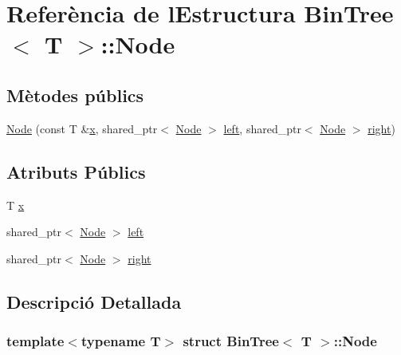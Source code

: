 \hypertarget{struct_bin_tree_1_1_node}{}\section{Referència de l\textquotesingle{}Estructura Bin\+Tree$<$ T $>$\+:\+:Node}
\label{struct_bin_tree_1_1_node}
\subsection*{Mètodes públics}
\begin{DoxyCompactItemize}
\item 
\hyperlink{struct_bin_tree_1_1_node_af45885e303875c018e89fa5c8b96bde0}{Node} (const T \&\hyperlink{struct_bin_tree_1_1_node_a9c268d4af01559e8237dbeb5bd19af91}{x}, shared\+\_\+ptr$<$ \hyperlink{struct_bin_tree_1_1_node}{Node} $>$ \hyperlink{struct_bin_tree_1_1_node_a265a6367635a38838e6a6366564be78d}{left}, shared\+\_\+ptr$<$ \hyperlink{struct_bin_tree_1_1_node}{Node} $>$ \hyperlink{struct_bin_tree_1_1_node_a6df770137090da60cd0376ce06893cbd}{right})
\end{DoxyCompactItemize}
\subsection*{Atributs Públics}
\begin{DoxyCompactItemize}
\item 
T \hyperlink{struct_bin_tree_1_1_node_a9c268d4af01559e8237dbeb5bd19af91}{x}
\item 
shared\+\_\+ptr$<$ \hyperlink{struct_bin_tree_1_1_node}{Node} $>$ \hyperlink{struct_bin_tree_1_1_node_a265a6367635a38838e6a6366564be78d}{left}
\item 
shared\+\_\+ptr$<$ \hyperlink{struct_bin_tree_1_1_node}{Node} $>$ \hyperlink{struct_bin_tree_1_1_node_a6df770137090da60cd0376ce06893cbd}{right}
\end{DoxyCompactItemize}


\subsection{Descripció Detallada}
\subsubsection*{template$<$typename T$>$\newline
struct Bin\+Tree$<$ T $>$\+::\+Node}



